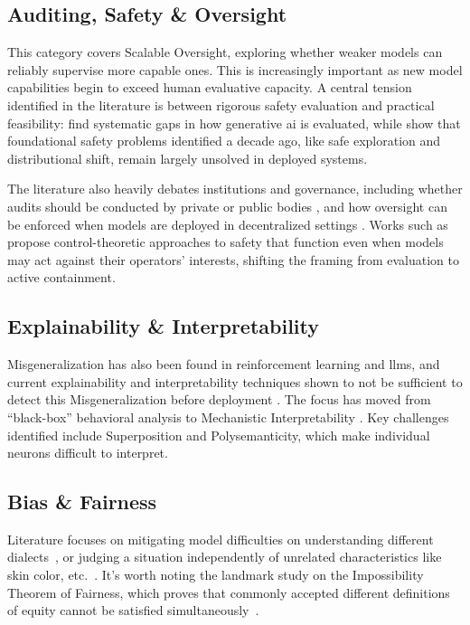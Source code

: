 		\subsection*{Auditing, Safety \& Oversight}

			This category covers Scalable Oversight, exploring whether weaker models can reliably supervise more capable ones. This is increasingly important as new model capabilities begin to exceed human evaluative capacity. A central tension identified in the literature is between rigorous safety evaluation and practical feasibility: \citeauthor{GapsSafetyEval2024} \cite{GapsSafetyEval2024} find systematic gaps in how generative \gls{ai} is evaluated, while \citeauthor{RajiDobbe2024} \cite{RajiDobbe2024} show that foundational safety problems identified a decade ago, like safe exploration and distributional shift, remain largely unsolved in deployed systems.

			The literature also heavily debates institutions and governance, including whether audits should be conducted by private or public bodies \cite{slr_search_6}, and how oversight can be enforced when models are deployed in decentralized settings \cite{LocalAIGov2024}. Works such as \citeauthor{greenblatt2023aicontrol} \cite{greenblatt2023aicontrol} propose control-theoretic approaches to safety that function even when models may act against their operators' interests, shifting the framing from evaluation to active containment.
		

		

		\subsection*{Explainability \& Interpretability}

			Misgeneralization has also been found in reinforcement learning and \glspl{llm}, and current explainability and interpretability techniques shown to not be sufficient to detect this Misgeneralization before deployment \cite{langosco2022goal}. The focus has moved from ``black-box'' behavioral analysis to Mechanistic Interpretability \cite{anthropic2025biology}. Key challenges identified include Superposition and Polysemanticity, which make individual neurons difficult to interpret.

		\subsection*{Bias \& Fairness}

			Literature focuses on mitigating model difficulties on understanding different dialects~\cite{lin2025dialect}, or judging a situation independently of unrelated characteristics like skin color, etc.~\cite{li_instance-consistent_2025}. It's worth noting the landmark study on the Impossibility Theorem of Fairness, which proves that commonly accepted different definitions of equity cannot be satisfied simultaneously~\cite{kleinberg2016inherent}.




